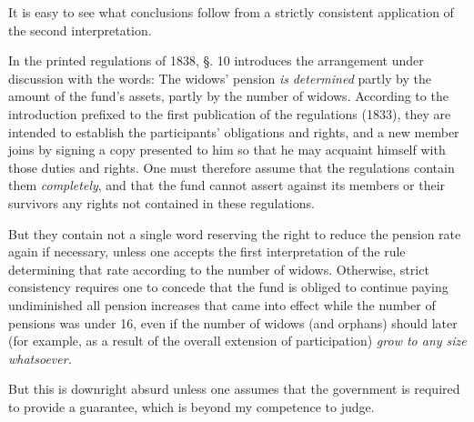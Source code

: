 It is easy to see what conclusions follow from a strictly consistent application of the second interpretation.

In the printed regulations of 1838, §. 10 introduces the arrangement under discussion with the words: The widows' pension \textit{is} \textit{determined} partly by the amount of the fund's assets, partly by the number of widows. According to the introduction prefixed to the first publication of the regulations (1833), they are intended to establish the participants' obligations and rights, and a new member joins by signing a copy presented to him so that he may acquaint himself with those duties and rights. One must therefore assume that the regulations contain them \textit{completely}, and that the fund cannot assert against its members or their survivors any rights not contained in these regulations.

But they contain not a single word reserving the right to reduce the pension rate again if necessary, unless one accepts the first interpretation of the rule determining that rate according to the number of widows. Otherwise, strict consistency requires one to concede that the fund is obliged to continue paying undiminished all pension increases that came into effect while the number of pensions was under 16, even if the number of widows (and orphans) should later (for example, as a result of the overall extension of participation) \textit{grow to any size whatsoever.}

But this is downright absurd unless one assumes that the government is required to provide a guarantee, which is beyond my competence to judge.

